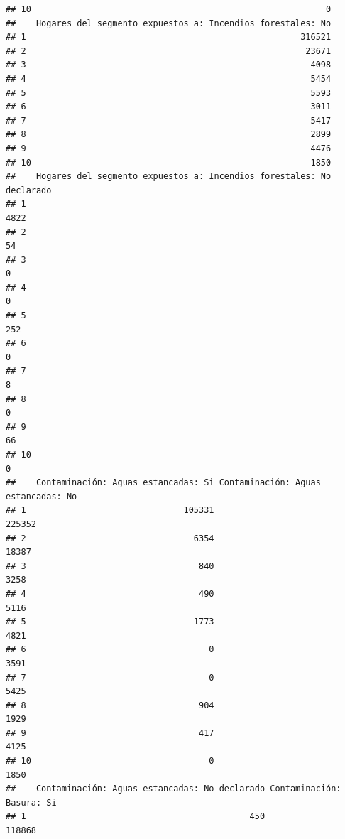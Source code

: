 \documentclass[11pt,]{article}
\begin{document}
\begin{verbatim}
## 10                                                          0
##    Hogares del segmento expuestos a: Incendios forestales: No
## 1                                                      316521
## 2                                                       23671
## 3                                                        4098
## 4                                                        5454
## 5                                                        5593
## 6                                                        3011
## 7                                                        5417
## 8                                                        2899
## 9                                                        4476
## 10                                                       1850
##    Hogares del segmento expuestos a: Incendios forestales: No declarado
## 1                                                                  4822
## 2                                                                    54
## 3                                                                     0
## 4                                                                     0
## 5                                                                   252
## 6                                                                     0
## 7                                                                     8
## 8                                                                     0
## 9                                                                    66
## 10                                                                    0
##    Contaminación: Aguas estancadas: Si Contaminación: Aguas estancadas: No
## 1                               105331                              225352
## 2                                 6354                               18387
## 3                                  840                                3258
## 4                                  490                                5116
## 5                                 1773                                4821
## 6                                    0                                3591
## 7                                    0                                5425
## 8                                  904                                1929
## 9                                  417                                4125
## 10                                   0                                1850
##    Contaminación: Aguas estancadas: No declarado Contaminación: Basura: Si
## 1                                            450                    118868

\end{verbatim}
\end{document}
